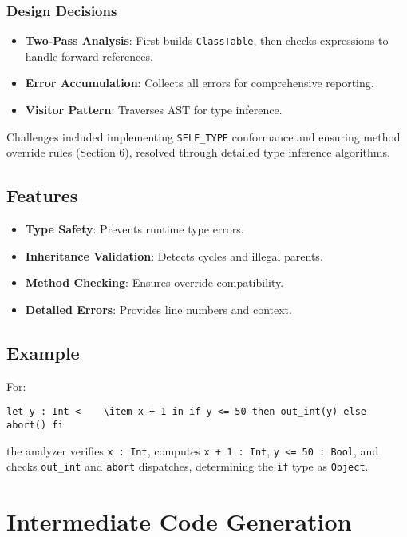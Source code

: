 \documentclass[11pt, titlepage]{article}
\begin{document}
\subsubsection{Design Decisions}

\begin{itemize}[leftmargin=*]
    \item \textbf{Two-Pass Analysis}: First builds \texttt{ClassTable}, then checks expressions to handle forward references.
    \item \textbf{Error Accumulation}: Collects all errors for comprehensive reporting.
    \item \textbf{Visitor Pattern}: Traverses AST for type inference.
\end{itemize}

Challenges included implementing \texttt{SELF\_TYPE} conformance and ensuring method override rules (Section 6), resolved through detailed type inference algorithms.

\subsection{Features}
\begin{itemize}[leftmargin=*]
    \item \textbf{Type Safety}: Prevents runtime type errors.
    \item \textbf{Inheritance Validation}: Detects cycles and illegal parents.
    \item \textbf{Method Checking}: Ensures override compatibility.
    \item \textbf{Detailed Errors}: Provides line numbers and context.
\end{itemize}

\subsection{Example}
For:
\begin{lstlisting}
let y : Int <    \item x + 1 in if y <= 50 then out_int(y) else abort() fi
\end{lstlisting}
the analyzer verifies \texttt{x : Int}, computes \texttt{x + 1 : Int}, \texttt{y <= 50 : Bool}, and checks \texttt{out\_int} and \texttt{abort} dispatches, determining the \texttt{if} type as \texttt{Object}.

\section{Intermediate Code Generation}
\label{sec:tac}
\end{document}
